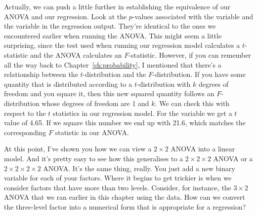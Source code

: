 Actually, we can push a little further in establishing the equivalence of our ANOVA and our regression. Look at the $p$-values associated with the  variable and the  variable in the regression output. They're identical to the ones we encountered earlier when running the ANOVA. This might seem a little surprising, since the test used when running our regression model calculates a $t$-statistic and the ANOVA calculates an $F$-statistic. However, if you can remember all the way back to Chapter~\ref{ch:probability}, I mentioned that there's a relationship between the $t$-distribution and the $F$-distribution. If you have some quantity that is distributed according to a $t$-distribution with $k$ degrees of freedom and you square it, then this new squared quantity follows an $F$-distribution whose degrees of freedom are 1 and $k$. We can check this with respect to the $t$ statistics in our regression model. For the  variable we get a $t$ value of 4.65. If we square this number we end up with 21.6, which matches the corresponding $F$ statistic in our ANOVA. 



At this point, I've shown you how we can view a $2\times 2$ ANOVA into a linear model. And it's pretty easy to see how this generalises to a $2 \times 2 \times 2$ ANOVA or a $2 \times 2 \times 2 \times 2$ ANOVA. It's the same thing, really. You just add a new binary variable for each of your factors. Where it begins to get trickier is when we consider factors that have more than two levels. Consider, for instance, the $3 \times 2$ ANOVA that we ran earlier in this chapter using the  data. How can we convert the three-level  factor into a numerical form that is appropriate for a regression?

